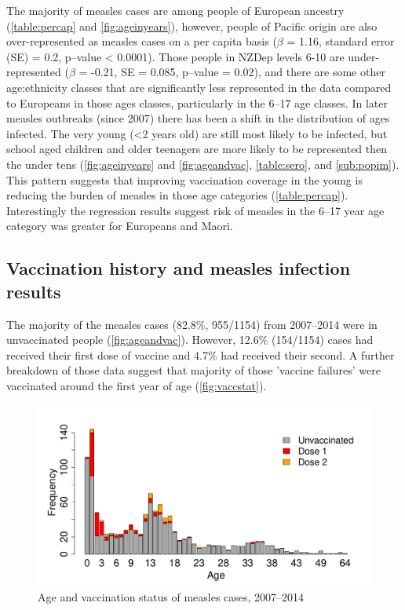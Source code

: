 \documentclass{article}
\begin{document}
The majority of measles cases are among people of European ancestry (\autoref{table:percap} and \autoref{fig:ageinyears}), however, people of Pacific origin are also over-represented as measles cases on a per capita basis ($\beta$ = 1.16, standard error (SE) = 0.2, p--value < 0.0001). Those people in NZDep levels 6-10 are under-represented ($\beta$ = -0.21, SE = 0.085, p--value = 0.02), and there are some other age:ethnicity classes that are significantly less represented in the data compared to Europeans in those ages classes, particularly in the 6--17 age classes. In later measles outbreaks (since 2007) there has been a shift in the distribution of ages infected. The very young (<2 years old) are still most likely to be infected, but school aged children and older teenagers are more likely to be represented then the under tens (\autoref{fig:ageinyears} and \autoref{fig:ageandvac}, \autoref{table:sero}, and \autoref{sub:popim}). This pattern suggests that improving vaccination coverage in the young is reducing the burden of measles in those age categories (\autoref{table:percap}). Interestingly the regression results suggest risk of measles in the 6--17 year age category was greater for Europeans and Maori.

\subsection{Vaccination history and measles infection results}

The majority of the measles cases (82.8\%, 955/1154) from 2007--2014 were in unvaccinated people (\autoref{fig:ageandvac}). However, 12.6\% (154/1154) cases had received their first dose of vaccine and 4.7\% had received their second. A further breakdown of those data suggest that majority of those 'vaccine failures' were vaccinated around the first year of age (\autoref{fig:vaccstat}).

\begin{figure}
\begin{center}
\includegraphics{draftfinalreport_v2-028}
\end{center}
\caption{Age and vaccination status of measles cases, 2007--2014}
\label{fig:ageandvac}
\end{figure}
\end{document}
